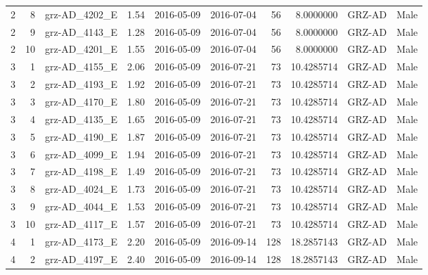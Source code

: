 \begin{tabular}{rrlrllrrll}
  2 & 8 & grz-AD\_4202\_E & 1.54 & 2016-05-09 & 2016-07-04 & 56 & 8.0000000 & GRZ-AD & Male \\ 
  2 & 9 & grz-AD\_4143\_E & 1.28 & 2016-05-09 & 2016-07-04 & 56 & 8.0000000 & GRZ-AD & Male \\ 
  2 & 10 & grz-AD\_4201\_E & 1.55 & 2016-05-09 & 2016-07-04 & 56 & 8.0000000 & GRZ-AD & Male \\ 
  3 & 1 & grz-AD\_4155\_E & 2.06 & 2016-05-09 & 2016-07-21 & 73 & 10.4285714 & GRZ-AD & Male \\ 
  3 & 2 & grz-AD\_4193\_E & 1.92 & 2016-05-09 & 2016-07-21 & 73 & 10.4285714 & GRZ-AD & Male \\ 
  3 & 3 & grz-AD\_4170\_E & 1.80 & 2016-05-09 & 2016-07-21 & 73 & 10.4285714 & GRZ-AD & Male \\ 
  3 & 4 & grz-AD\_4135\_E & 1.65 & 2016-05-09 & 2016-07-21 & 73 & 10.4285714 & GRZ-AD & Male \\ 
  3 & 5 & grz-AD\_4190\_E & 1.87 & 2016-05-09 & 2016-07-21 & 73 & 10.4285714 & GRZ-AD & Male \\ 
  3 & 6 & grz-AD\_4099\_E & 1.94 & 2016-05-09 & 2016-07-21 & 73 & 10.4285714 & GRZ-AD & Male \\ 
  3 & 7 & grz-AD\_4198\_E & 1.49 & 2016-05-09 & 2016-07-21 & 73 & 10.4285714 & GRZ-AD & Male \\ 
  3 & 8 & grz-AD\_4024\_E & 1.73 & 2016-05-09 & 2016-07-21 & 73 & 10.4285714 & GRZ-AD & Male \\ 
  3 & 9 & grz-AD\_4044\_E & 1.53 & 2016-05-09 & 2016-07-21 & 73 & 10.4285714 & GRZ-AD & Male \\ 
  3 & 10 & grz-AD\_4117\_E & 1.57 & 2016-05-09 & 2016-07-21 & 73 & 10.4285714 & GRZ-AD & Male \\ 
  4 & 1 & grz-AD\_4173\_E & 2.20 & 2016-05-09 & 2016-09-14 & 128 & 18.2857143 & GRZ-AD & Male \\ 
  4 & 2 & grz-AD\_4197\_E & 2.40 & 2016-05-09 & 2016-09-14 & 128 & 18.2857143 & GRZ-AD & Male \\ 
   \bottomrule \end{tabular}
